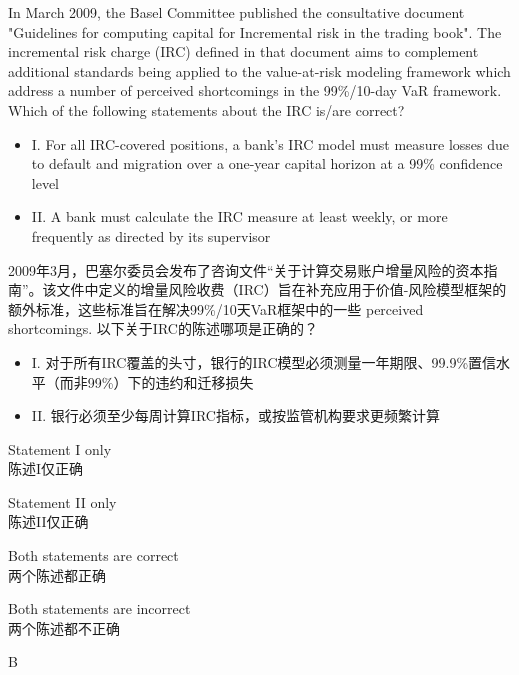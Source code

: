 \documentclass{article}
\newcounter{question} %
\begin{document}
\begin{question}
    In March 2009, the Basel Committee published the consultative document "Guidelines for computing capital for Incremental risk in the trading book". The incremental risk charge (IRC) defined in that document aims to complement additional standards being applied to the value-at-risk modeling framework which address a number of perceived shortcomings in the 99\%/10-day VaR framework. Which of the following statements about the IRC is/are correct?
    \begin{itemize}
    \item I. For all IRC-covered positions, a bank's IRC model must measure losses due to default and migration over a one-year capital horizon at a 99\% confidence level
    \item II. A bank must calculate the IRC measure at least weekly, or more frequently as directed by its supervisor
    \end{itemize}
    2009年3月，巴塞尔委员会发布了咨询文件“关于计算交易账户增量风险的资本指南”。该文件中定义的增量风险收费（IRC）旨在补充应用于价值-风险模型框架的额外标准，这些标准旨在解决99\%/10天VaR框架中的一些 perceived shortcomings. 以下关于IRC的陈述哪项是正确的？
    \begin{itemize}
    \item I. 对于所有IRC覆盖的头寸，银行的IRC模型必须测量一年期限、99.9\%置信水平（而非99\%）下的违约和迁移损失
    \item II. 银行必须至少每周计算IRC指标，或按监管机构要求更频繁计算
    \end{itemize}
\end{question}

\begin{choices}
    \item Statement I only\\
    陈述I仅正确
    \item Statement II only\\
    陈述II仅正确
    \item Both statements are correct\\
    两个陈述都正确
    \item Both statements are incorrect\\
    两个陈述都不正确
\end{choices}

\begin{correctanswer}
    B
\end{correctanswer}
\end{document}
